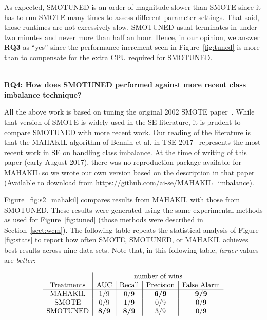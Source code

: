 \documentclass[sigconf]{acmart}
\theoremstyle{break}
\newcommand{\sma}{{\sc SMOTE}}
\newcommand{\smb}{{\sc SMOTUNED}}
\begin{document}
As expected,  {\smb} is an order of magnitude slower than {\sma} since
it has to run {\sma} many times to assess different parameter settings.
That said, those runtimes are not excessively slow.
{\smb} usual terminates in under two minutes and never more than half an hour.
Hence, in  our opinion, we answer {\bf RQ3} as ``yes'' since the   performance increment
seen in Figure~\ref{fig:tuned} is more than to compensate for the extra CPU required for {\smb}.

\noindent
{\bf \\RQ4: How does SMOTUNED performed against more recent class imbalance technique?}

All the above work is based on tuning the original 2002 {\sma} paper~\cite{chawla2002smote}. While that
version of {\sma} is widely used in the SE literature, 
it is prudent to compare {\smb} with more recent work.
Our reading
of the literature is that the MAHAKIL algorithm  of Bennin et al. in TSE 2017~\cite{bennin2017mahakil} represents the most recent work in  SE on handling  
class imbalance.  
At the time of writing of this paper (early August 2017), there was no reproduction package available for MAHAKIL so we wrote our own version
based on the description in that paper %
(Available to download from https://github.com/ai-se/MAHAKIL\_imbalance).

Figure~\ref{fig:s2_mahakil} compares   results from MAHAKIL with those from {\smb}. These results
were generated using the same experimental methods as used for   Figure~\ref{fig:tuned} (those methods were described in  Section~\ref{sect:wcm}).
The following table repeats   the statistical analysis of Figure \ref{fig:stats} to report how often
  {\sma}, {\smb}, or MAHAKIL achieves best results across nine data sets.   Note that, in this following table, {\em larger} values are {\em better}:

{\small\[\begin{array}{*{20}{c|c|c|c|c}}
  & \multicolumn{4}{c}{\text{number of wins}}\\ 
    {\text{Treatments}} & {\text{AUC}} & {\text{Recall}} & {\text{Precision}}& {\text{False Alarm}}\\
    \hline
   {\text{MAHAKIL}} & 1/9 & 0/9 & \textbf{6/9} & \textbf{9/9}  \\
   {\text{SMOTE}}& 0/9 & 1/9 & 0/9 & 0/9 \\
   {\text{SMOTUNED}}& \textbf{8/9} & \textbf{8/9} & 3/9  & 0/9  \\
 \end{array} \]}
\end{document}
